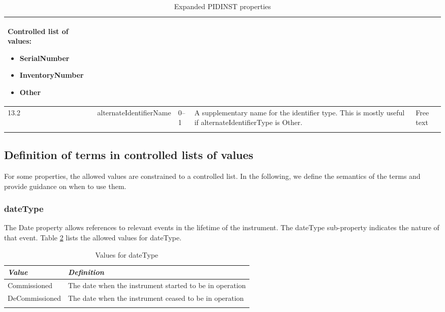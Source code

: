 \documentclass[titlepage=true,twoside=false,DIV=13]{scrartcl}
\begin{document}
\begin{longtable}{|l|l|l|p{}|p{\valcolw}|}
\begin{minipage}[t]{\valcolw}
            Controlled list of values:
            \begin{itemize}[nosep,leftmargin=3.5ex]
            \item SerialNumber
            \item InventoryNumber
            \item Other
            \end{itemize}
            \vspace{1ex}
          \end{minipage} \\
  \hline
  13.2  & alternateIdentifierName      & 0--1
        & A supplementary name for the identifier type.  This is
          mostly useful if alternateIdentifierType is Other.
        & Free text \\
  \hline
  \caption{Expanded PIDINST properties}
  \label{tab:schema:expandprops}
\end{longtable}

\subsection{Definition of terms in controlled lists of values}

For some properties, the allowed values are constrained to a
controlled list.  In the following, we define the semantics of the
terms and provide guidance on when to use them.

\newlength{\valnamecolw}\settowidth{\valnamecolw}{IsPreviousVersionOf}
\newlength{\valdefcolw}
\setlength{\valdefcolw}{\textwidth}
\addtolength{\valdefcolw}{-\valnamecolw}
\addtolength{\valdefcolw}{-4\tabcolsep}

\subsubsection{dateType}

The Date property allows references to relevant events in the lifetime
of the instrument.  The dateType sub-property indicates the nature of
that event.  Table \ref{tab:schema:values:dateType} lists the allowed
values for dateType.

\begin{longtable}{|l|l|}
  \hline
  \emph{Value} & \emph{Definition} \\
  \hline \endhead
  \hline \endfoot\endlastfoot
  Commissioned   & The date when the instrument started to be in operation \\
  DeCommissioned & The date when the instrument ceased to be in operation \\
  \hline
  \caption{Values for dateType}
  \label{tab:schema:values:dateType}
\end{longtable}
\end{document}
